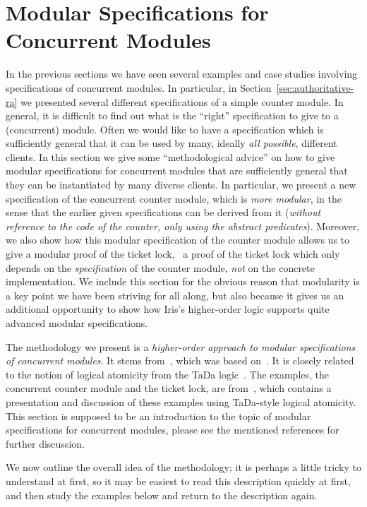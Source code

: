 
\section{Modular Specifications for Concurrent Modules}
\label{sec:modular-specs-of-concurrent-modules}

In the previous sections we have seen several examples and case studies involving specifications of concurrent modules.
In particular, in Section~\ref{sec:authoritative-ra} we presented several different specifications of a simple counter module.
In general, it is difficult to find out what is the ``right'' specification to give to a (concurrent) module.
Often we would like to have a specification which is sufficiently general that it can be used by many, ideally \emph{all possible}, different clients.
In this section we give some ``methodological advice'' on how to give modular specifications for concurrent modules that are sufficiently general that they can be instantiated by many diverse clients.
In particular, we present a new specification of the concurrent counter module, which is \emph{more modular}, in the sense that the earlier given specifications can be derived from it (\emph{without reference to the code of the counter, only using the abstract predicates}).
Moreover, we also show how this modular specification of the counter module allows us to give a modular proof of the ticket lock, \ie\ a proof of the ticket lock which only depends on the \emph{specification} of the counter module, \emph{not} on the concrete implementation.
We include this section for the obvious reason that modularity is a key point we have been striving for all along, but also because it gives us an additional opportunity to show how Iris's higher-order logic supports quite advanced modular specifications.

The methodology we present is a \emph{higher-order approach to modular specifications of concurrent modules}.
It stems from~\cite{hocap-conf}, which was based on~\cite{Jacobs:Piessens:2011}.
It is closely related to the notion of logical atomicity from the TaDa logic~\cite{TaDa}.
The examples, the concurrent counter module and the ticket lock, are from~\cite{DINSDALEYOUNG20181}, which contains a presentation and discussion of these examples using TaDa-style logical atomicity.
This section is supposed to be an introduction to the topic of modular specifications for concurrent modules, please see the mentioned references for further discussion.


We now outline the overall idea of the methodology; it is perhaps a little tricky to understand at first, so it may be easiest to read this description quickly at first, and then study the examples below and return to the description again.

